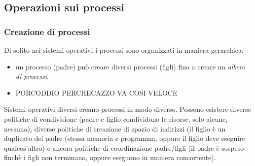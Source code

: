 \documentclass[11pt]{article}
\begin{document}
\subsection{Operazioni sui processi}
\subsubsection{Creazione di processi}
Di solito nei sistemi operativi i processi sono organizzati in maniera gerarchica:
\begin{itemize}
\item un processo (padre) può creare diversi processi (figli) fino a creare un \textit{albero di processi}.
\item PORCODDIO PERCHECAZZO VA COSI VELOCE
\end{itemize}
Sistemi operativi diversi creano processi in modo diverso. Possono esistere diverse politiche di condivisione (padre e figlio condividono le risorse, solo alcune, nessuna), diverse politiche di creazione di spazio di indirizzi (il figlio è un duplicato del padre (stessa memoria e programma, oppure il figlio deve eseguire qualcos'altro) e ancora politiche di coordinazione padre/figli (il padre è sospeso finchè i figli non terminano, oppure eseguono in maniera concorrente).
\end{document}
